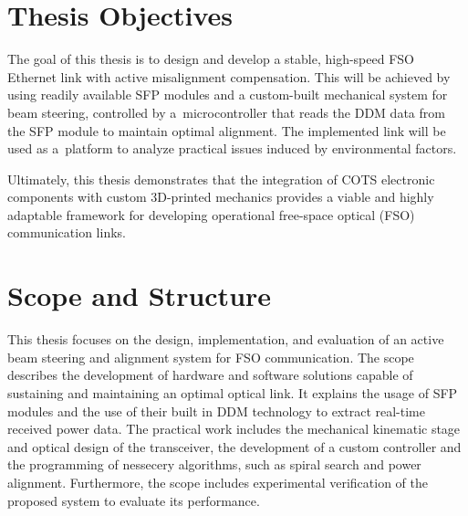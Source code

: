 \documentclass[master,oneside,en,oldtitlepage]{dyplompwr}
\begin{document}
\section{Thesis Objectives}
The goal of this thesis is to design and develop a stable, high-speed FSO Ethernet link with active misalignment compensation.
This will be achieved by using  readily available SFP modules and a custom-built mechanical system for beam steering, controlled by a~microcontroller that reads the \ac{DDM} data from the SFP module to maintain optimal alignment.
The implemented link will be used as a~platform to analyze practical issues induced by environmental factors. 

Ultimately, this thesis demonstrates that the integration of \ac{COTS} electronic components with custom 3D-printed mechanics provides a viable and highly adaptable framework for developing operational free-space optical (FSO) communication links.

\section{Scope and Structure}
This thesis focuses on the design, implementation, and evaluation of an active beam steering and alignment system for FSO communication. The scope describes the development of hardware and software solutions capable of sustaining and maintaining an optimal optical link. It explains the usage of SFP modules and the use of their built in DDM technology to extract real-time received power data. The practical work includes the mechanical kinematic stage and optical design of the transceiver, the development of a custom controller and the programming of nessecery algorithms, such as spiral search and power alignment.
Furthermore, the scope includes experimental verification of the proposed system to evaluate its performance.


\end{document}
